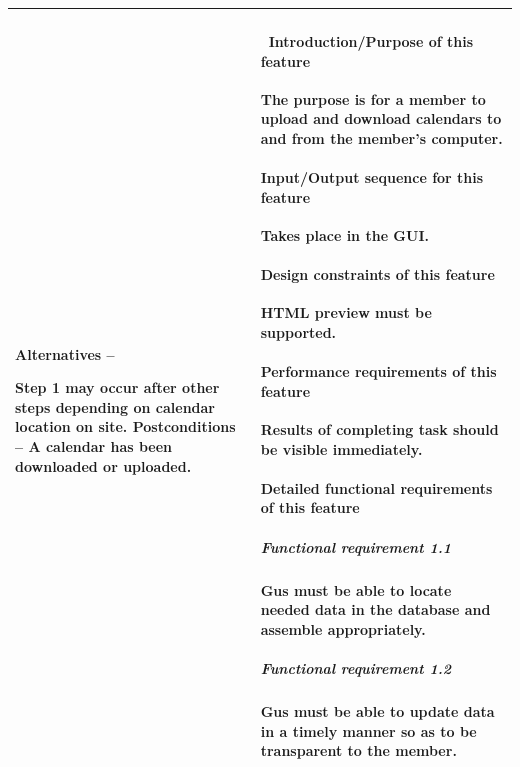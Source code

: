 \documentclass[letterpaper]{article}
\begin{document}
\begin{flushleft}
\begin{supertabular}{|m{3.17056in}|m{3.1712599in}|}
{\color{black} Alternatives -- }

\color{black} Step 1 may occur after other steps depending on calendar
location on site.\newline
Postconditions -- A calendar has been downloaded or uploaded. &
\paragraph[\ Introduction/Purpose of this
feature]{\rmfamily \ Introduction/Purpose of
this feature}
{\color{black} The purpose is for a member to upload and download
calendars to and from the member{\textquoteright}s computer.}

\paragraph[Input/Output sequence for this
feature]{\rmfamily Input/Output sequence for
this feature}
{\color{black} Takes place in the GUI.}

\paragraph[Design constraints of this
feature]{\rmfamily Design constraints of this
feature}
{\color{black} HTML preview must be supported.}

\paragraph[Performance requirements of this
feature]{\rmfamily Performance requirements of
this feature}
{\color{black} Results of completing task should be visible
immediately.}

\paragraph[Detailed functional requirements of this
feature]{\rmfamily Detailed functional
requirements of this feature}
\subparagraph[Functional requirement 1.1]{
Functional requirement 1.1}
{\color{black} Gus must be able to locate needed data in the database
and assemble appropriately.}

\subparagraph[Functional requirement 1.2]{
Functional requirement 1.2}
{\color{black} Gus must be able to update data in a timely manner so as
to be transparent to the member.}

~
\\\hline
\end{supertabular}
\end{flushleft}
\end{document}
